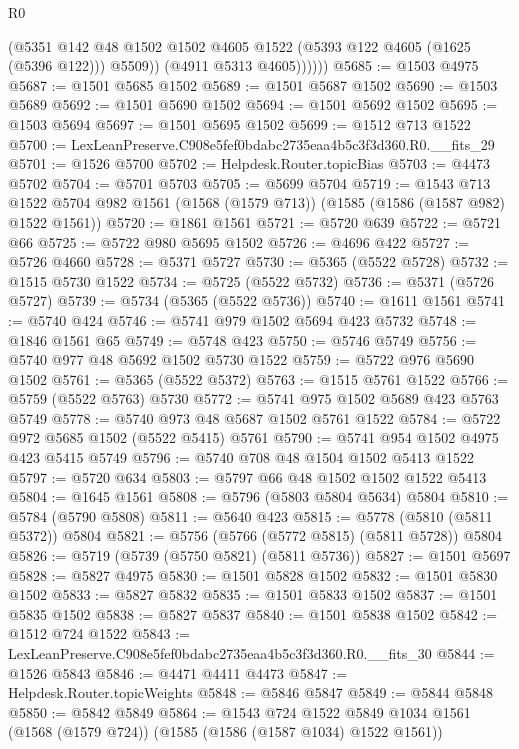 \begin{lexlean}{R0}
\begin{coremodule}
                (@5351
                  @142
                  @48
                  @1502
                  @1502
                  @4605
                  @1522
                  (@5393 @122 @4605 (@1625 (@5396 @122)))
                  @5509))
              (@4911 @5313 @4605))))))
@5685 := @1503 @4975
@5687 := @1501 @5685 @1502
@5689 := @1501 @5687 @1502
@5690 := @1503 @5689
@5692 := @1501 @5690 @1502
@5694 := @1501 @5692 @1502
@5695 := @1503 @5694
@5697 := @1501 @5695 @1502
@5699 := @1512 @713 @1522
@5700 := LexLeanPreserve.C908e5fef0bdabc2735eaa4b5c3f3d360.R0.__fits_29
@5701 := @1526 @5700
@5702 := Helpdesk.Router.topicBias
@5703 := @4473 @5702
@5704 := @5701 @5703
@5705 := @5699 @5704
@5719 := @1543
    @713
    @1522
    @5704
    @982
    @1561
    (@1568 (@1579 @713))
    (@1585 (@1586 (@1587 @982) @1522 @1561))
@5720 := @1861 @1561
@5721 := @5720 @639
@5722 := @5721 @66
@5725 := @5722 @980 @5695 @1502
@5726 := @4696 @422
@5727 := @5726 @4660
@5728 := @5371 @5727
@5730 := @5365 (@5522 @5728)
@5732 := @1515 @5730 @1522
@5734 := @5725 (@5522 @5732)
@5736 := @5371 (@5726 @5727)
@5739 := @5734 (@5365 (@5522 @5736))
@5740 := @1611 @1561
@5741 := @5740 @424
@5746 := @5741 @979 @1502 @5694 @423 @5732
@5748 := @1846 @1561 @65
@5749 := @5748 @423
@5750 := @5746 @5749
@5756 := @5740 @977 @48 @5692 @1502 @5730 @1522
@5759 := @5722 @976 @5690 @1502
@5761 := @5365 (@5522 @5372)
@5763 := @1515 @5761 @1522
@5766 := @5759 (@5522 @5763) @5730
@5772 := @5741 @975 @1502 @5689 @423 @5763 @5749
@5778 := @5740 @973 @48 @5687 @1502 @5761 @1522
@5784 := @5722 @972 @5685 @1502 (@5522 @5415) @5761
@5790 := @5741 @954 @1502 @4975 @423 @5415 @5749
@5796 := @5740 @708 @48 @1504 @1502 @5413 @1522
@5797 := @5720 @634
@5803 := @5797 @66 @48 @1502 @1502 @1522 @5413
@5804 := @1645 @1561
@5808 := @5796 (@5803 @5804 @5634) @5804
@5810 := @5784 (@5790 @5808)
@5811 := @5640 @423
@5815 := @5778 (@5810 (@5811 @5372)) @5804
@5821 := @5756 (@5766 (@5772 @5815) (@5811 @5728)) @5804
@5826 := @5719 (@5739 (@5750 @5821) (@5811 @5736))
@5827 := @1501 @5697
@5828 := @5827 @4975
@5830 := @1501 @5828 @1502
@5832 := @1501 @5830 @1502
@5833 := @5827 @5832
@5835 := @1501 @5833 @1502
@5837 := @1501 @5835 @1502
@5838 := @5827 @5837
@5840 := @1501 @5838 @1502
@5842 := @1512 @724 @1522
@5843 := LexLeanPreserve.C908e5fef0bdabc2735eaa4b5c3f3d360.R0.__fits_30
@5844 := @1526 @5843
@5846 := @4471 @4411 @4473
@5847 := Helpdesk.Router.topicWeights
@5848 := @5846 @5847
@5849 := @5844 @5848
@5850 := @5842 @5849
@5864 := @1543
    @724
    @1522
    @5849
    @1034
    @1561
    (@1568 (@1579 @724))
    (@1585 (@1586 (@1587 @1034) @1522 @1561))

\end{coremodule}
\end{lexlean}
